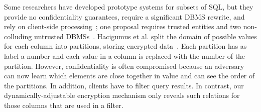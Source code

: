 Some researchers have developed prototype systems for subsets of SQL,
but they provide no confidentiality guarantees, require a significant
DBMS rewrite, and rely on client-side
processing~\cite{sqlOverEncryption,damianiIndex,Ciriani09keepafew};
one proposal requires trusted entities and two non-colluding
untrusted DBMSs~\cite{two-party-computation}.  Hacigumus et al. split
the domain of possible values for each column into partitions, storing
encrypted data~\cite{sqlOverEncryption}. Each partition has as label a
number and each value in a column is replaced with the number of the
partition.
However, confidentiality is often compromised because an adversary can
now learn which elements are close together in value and can see the
order of the partitions.  In addition, clients have to filter query
results.  In contrast, our dynamically-adjustable encryption mechanism
only reveals such relations for those columns that are used in a
filter.






